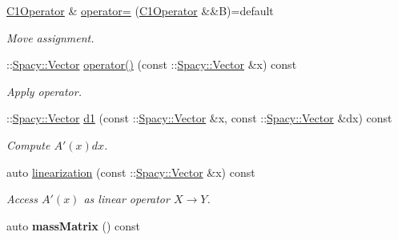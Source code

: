 \begin{DoxyCompactItemize}
\hyperlink{classSpacy_1_1KaskadeParabolic_1_1C1Operator}{C1\-Operator} \& \hyperlink{classSpacy_1_1KaskadeParabolic_1_1C1Operator_a9c201f25caa56cebeb851f97771cca8d}{operator=} (\hyperlink{classSpacy_1_1KaskadeParabolic_1_1C1Operator}{C1\-Operator} \&\&B)=default
\begin{DoxyCompactList}\small\item\em Move assignment. \end{DoxyCompactList}\item 
\-::\hyperlink{classSpacy_1_1Vector}{Spacy\-::\-Vector} \hyperlink{classSpacy_1_1KaskadeParabolic_1_1C1Operator_a735f5cf1b02a24faec5c76b039a9ed8f}{operator()} (const \-::\hyperlink{classSpacy_1_1Vector}{Spacy\-::\-Vector} \&x) const 
\begin{DoxyCompactList}\small\item\em Apply operator. \end{DoxyCompactList}\item 
\-::\hyperlink{classSpacy_1_1Vector}{Spacy\-::\-Vector} \hyperlink{classSpacy_1_1KaskadeParabolic_1_1C1Operator_aef8fbbb0007ebb0f2ad458cb1804e1de}{d1} (const \-::\hyperlink{classSpacy_1_1Vector}{Spacy\-::\-Vector} \&x, const \-::\hyperlink{classSpacy_1_1Vector}{Spacy\-::\-Vector} \&dx) const 
\begin{DoxyCompactList}\small\item\em Compute $A'(x)dx$. \end{DoxyCompactList}\item 
\hypertarget{classSpacy_1_1KaskadeParabolic_1_1C1Operator_afbe261e063a26a8d40231e765cc410bc}{auto \hyperlink{classSpacy_1_1KaskadeParabolic_1_1C1Operator_afbe261e063a26a8d40231e765cc410bc}{linearization} (const \-::\hyperlink{classSpacy_1_1Vector}{Spacy\-::\-Vector} \&x) const }\label{classSpacy_1_1KaskadeParabolic_1_1C1Operator_afbe261e063a26a8d40231e765cc410bc}

\begin{DoxyCompactList}\small\item\em Access $A'(x)$ as linear operator $X\rightarrow Y$. \end{DoxyCompactList}\item 
\hypertarget{classSpacy_1_1KaskadeParabolic_1_1C1Operator_afa858617575195bfecc5ecd1502748c3}{auto {\bfseries mass\-Matrix} () const }\label{classSpacy_1_1KaskadeParabolic_1_1C1Operator_afa858617575195bfecc5ecd1502748c3}


\end{DoxyCompactItemize}

